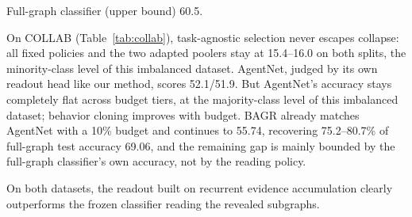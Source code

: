 \documentclass{article}
\begin{document}
\begin{table}[!htb]
\centering
\caption{CIFAR10 superpixels, test accuracy (\%). BC and RL denote the reader after teacher behavior cloning and after reinforcement learning; the reference head is the frozen classifier on RL-revealed subgraphs.}
\label{tab:cifar10}

\smallskip
{\footnotesize Full-graph classifier (upper bound) 60.5.}
\end{table}

On COLLAB (Table~\ref{tab:collab}), task-agnostic selection never escapes collapse: all fixed policies and the two adapted poolers stay at 15.4--16.0 on both splits, the minority-class level of this imbalanced dataset. AgentNet, judged by its own readout head like our method, scores 52.1/51.9. But AgentNet's accuracy stays completely flat across budget tiers, at the majority-class level of this imbalanced dataset; behavior cloning improves with budget. BAGR already matches AgentNet with a 10\% budget and continues to 55.74, recovering 75.2--80.7\% of full-graph test accuracy 69.06, and the remaining gap is mainly bounded by the full-graph classifier's own accuracy, not by the reading policy.

On both datasets, the readout built on recurrent evidence accumulation clearly outperforms the frozen classifier reading the revealed subgraphs.
\end{document}
